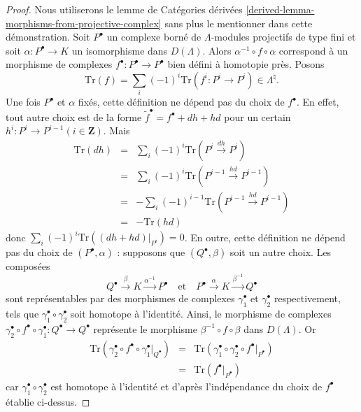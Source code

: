 \begin{proof}
Nous utiliserons le lemme de Catégories dérivées
\ref{derived-lemma-morphisms-from-projective-complex}
sans plus le mentionner dans cette démonstration.
Soit $P^\bullet$ un complexe borné de $\Lambda$-modules projectifs de type fini
et soit $\alpha : P^\bullet \to K$ un isomorphisme dans $D(\Lambda)$. Alors
$\alpha^{-1}\circ f\circ \alpha$ correspond à un morphisme de complexes
$f^\bullet : P^\bullet \to P^\bullet$ bien défini à homotopie près.
Posons
$$
\text{Tr}(f) = \sum_i (-1)^i \text{Tr}(f^i : P^i \to P^i) \in \Lambda^\natural.
$$
Une fois $P^\bullet$ et $\alpha$ fixés, cette définition ne dépend pas du choix de
$f^\bullet$. En effet, tout autre choix est de la forme
$\tilde{f}^\bullet = f^\bullet + dh +hd$ pour un certain
$h^i : P^i \to P^{i-1}(i\in \mathbf{Z})$. Mais
\begin{eqnarray*}
\text{Tr}(dh) & = & \sum_i (-1)^i \text{Tr}(P^i\xrightarrow{dh} P^i) \\
& = & \sum_i (-1)^i \text{Tr}(P^{i-1}\xrightarrow{hd} P^{i-1}) \\
& = & -\sum_i (-1)^{i-1}\text{Tr}(P^{i-1}\xrightarrow{hd} P^{i-1}) \\
& = & - \text{Tr}(hd)
\end{eqnarray*}
donc $\sum_i (-1)^i \text{Tr} ((dh+hd)|_{P^i})=0$.
En outre, cette définition ne dépend pas du choix de $(P^\bullet , \alpha)$ :
supposons que $(Q^\bullet, \beta)$ soit un autre choix. Les composées
$$
Q^\bullet \xrightarrow{\beta} K \xrightarrow{\alpha^{-1}} P^\bullet
\quad\text{et}\quad
P^\bullet \xrightarrow{\alpha} K \xrightarrow{\beta^{-1}} Q^\bullet
$$
sont représentables par des morphismes de complexes $\gamma_1^\bullet$ et
$\gamma_2^\bullet$ respectivement, tels que $\gamma_1^\bullet \circ
\gamma_2^\bullet$ soit homotope à l'identité. Ainsi, le morphisme de complexes
$\gamma_2^\bullet\circ f^\bullet\circ \gamma_1^\bullet : Q^\bullet\to Q^\bullet$
représente le morphisme $\beta^{-1}\circ f\circ\beta$ dans $D(\Lambda)$. Or
\begin{eqnarray*}
\text{Tr}(\gamma_2^\bullet\circ f^\bullet\circ\gamma_1^\bullet|_{Q^\bullet}) &
= & \text{Tr}(\gamma_1^\bullet \circ\gamma_2^\bullet \circ
f^\bullet|_{P^\bullet})\\
& = & \text{Tr}(f^\bullet|_{P^\bullet})
\end{eqnarray*}
car $\gamma_1^\bullet \circ \gamma_2^\bullet$ est homotope à
l'identité et d'après l'indépendance du choix de $f^\bullet$ établie ci-dessus.
\end{proof}




